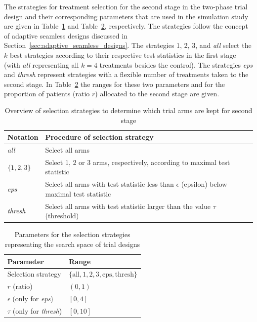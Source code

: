 \documentclass[bimj,fleqn]{w-art}
\theoremstyle{plain}
\theoremstyle{definition}
\begin{document}
The strategies for treatment selection for the second stage in the two-phase trial design and their corresponding parameters that are used in the simulation study are given in Table~\ref{tab:selection_strategies} and Table~\ref{tab:search_space}, respectively.
The strategies follow the concept of adaptive seamless designs discussed in Section~\ref{sec:adaptive_seamless_designs}. 
The strategies 1, 2, 3, and \emph{all} select the $k$ best strategies according to their respective test statistics in the first stage (with \emph{all} representing all $k=4$ treatments besides the control). 
The strategies \emph{eps} and \emph{thresh} represent strategies with a flexible number of treatments taken to the second stage. 
In Table~\ref{tab:search_space} the ranges for these two parameters and for the proportion of patients (ratio $r$) allocated to the second stage are given.
\begin{table}[h]
  \caption{Overview of selection strategies to determine which trial arms are kept for second stage}
  \label{tab:selection_strategies}
  \centering
  \begin{tabular}{ll}
  \hline
  Notation       & Procedure of selection strategy  \\
  \hline
  \emph{all}     & Select all arms  \\
  $\{1,2,3\}$    & Select 1, 2 or 3 arms, respectively, according to maximal test statistic \\
  \emph{eps}     & Select all arms with test statistic less than $\epsilon$ (epsilon) below maximal test statistic \\
  \emph{thresh}  & Select all arms with test statistic larger than the value $\tau$ (threshold) \\
  \hline
  \end{tabular}
\end{table}
\begin{table}[h]
  \caption{Parameters for the selection strategies representing the search space of trial designs}
  \label{tab:search_space}
  \centering
  \begin{tabular}{ll}
  \hline
  Parameter                        & Range \\
  \hline
  Selection strategy               & $\{\text{all}, 1, 2, 3, \text{eps}, \text{thresh} \}$ \\
  $r$ (ratio)                      & $(0,1)$ \\
  $\epsilon$ (only for \emph{eps}) & $[0,4]$ \\
  $\tau$ (only for \emph{thresh})  & $[0,10]$ \\
  \hline
  \end{tabular}
\end{table}
\end{document}
